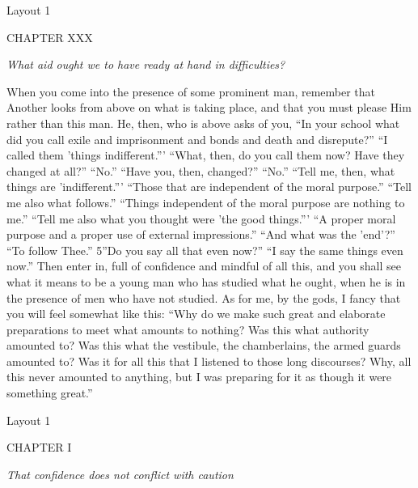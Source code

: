 

Layout 1

CHAPTER XXX

\emph{What aid ought we to have ready at hand in difficulties?}

When you come into the presence of some prominent man, remember that Another looks from above on what is taking place, and that you must please Him rather than this man. He, then, who is above asks of you, ``In your school what did you call exile and imprisonment and bonds and death and disrepute?'' ``I called them 'things indifferent.''' ``What, then, do you call them now? Have they changed at all?'' ``No.'' ``Have you, then, changed?'' ``No.'' ``Tell me, then, what things are 'indifferent.''' ``Those that are independent of the moral purpose.'' ``Tell me also what follows.'' ``Things independent of the moral purpose are nothing to me.'' ``Tell me also what you thought were 'the good things.''' ``A proper moral purpose and a proper use of external impressions.'' ``And what was the 'end'?'' ``To follow Thee.'' 5''Do you say all that even now?'' ``I say the same things even now.'' Then enter in, full of confidence and mindful of all this, and you shall see what it means to be a young man who has studied what he ought, when he is in the presence of men who have not studied. As for me, by the gods, I fancy that you will feel somewhat like this: ``Why do we make such great and elaborate preparations to meet what amounts to nothing? Was this what authority amounted to? Was this what the vestibule, the chamberlains, the armed guards amounted to? Was it for all this that I listened to those long discourses? Why, all this never amounted to anything, but I was preparing for it as though it were something great.''




Layout 1

CHAPTER I

\emph{That confidence does not conflict with caution}

